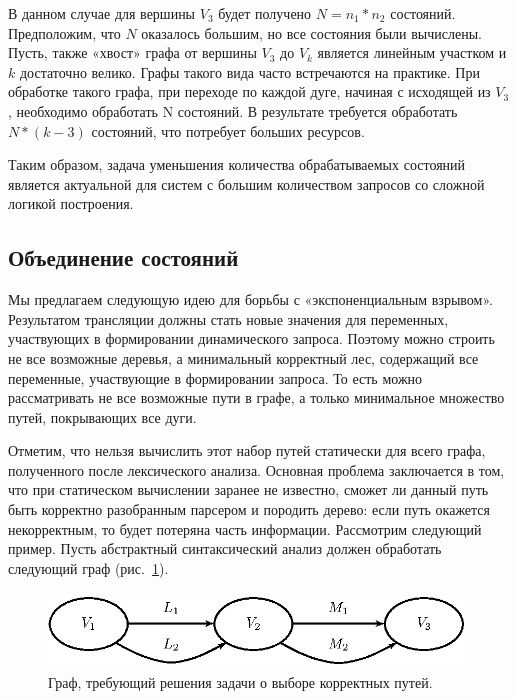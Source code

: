 \documentclass[a5paper]{article}
\begin{document}
В данном случае для вершины $V_3$ будет получено $N = n_1*n_2$ состояний. Предположим, что $N$ оказалось большим, но все состояния были вычислены. Пусть, также «хвост» графа от вершины $V_3$ до $V_k$ является линейным участком и $k$ достаточно велико. Графы такого вида часто встречаются на практике. При обработке такого графа, при переходе по каждой дуге, начиная с исходящей из $V_3$, необходимо обработать N состояний. В результате требуется обработать $N*(k-3)$ состояний, что потребует больших ресурсов.

Таким образом, задача уменьшения количества обрабатываемых состояний является  актуальной для систем с большим количеством запросов со сложной логикой построения.

\subsection{Объединение состояний}

Мы предлагаем следующую идею для борьбы с «экспоненциальным взрывом». Результатом трансляции должны стать новые значения для переменных, участвующих в формировании динамического запроса. Поэтому можно строить не все возможные деревья, а минимальный корректный лес, содержащий все переменные, участвующие в формировании запроса. То есть можно рассматривать не все возможные пути в графе, а только минимальное множество путей, покрывающих все дуги.

Отметим, что нельзя вычислить этот набор путей статически для всего графа, полученного после лексического анализа. Основная проблема заключается в том, что при статическом вычислении заранее не известно, сможет ли данный путь быть корректно разобранным парсером и породить дерево: если путь окажется некорректным, то будет потеряна часть информации.
Рассмотрим следующий пример. Пусть абстрактный синтаксический анализ должен обработать следующий граф (рис.~\ref{pic6}).


\begin{figure}
    \begin{center}
        \includegraphics[width=11cm,height=2cm]{graphs/paths.eps}
        \caption{Граф, требующий решения задачи о выборе корректных путей.}
        \label{pic6}
    \end{center}
\end{figure}
\end{document}
